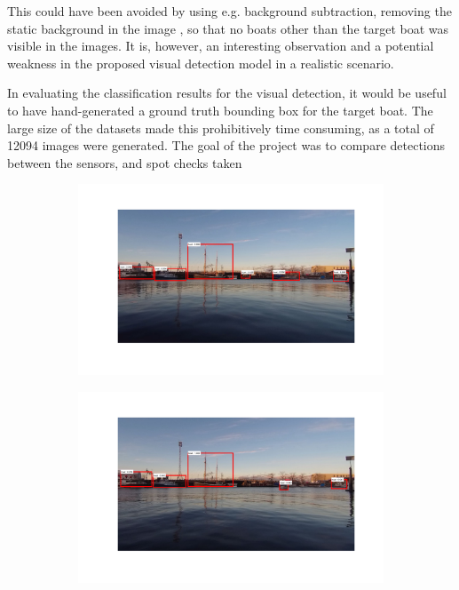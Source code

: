 This could have been avoided by using e.g. background subtraction, removing the static background in the image \cite{modernCV}, so that no boats other than the target boat was visible in the images. It is, however, an interesting observation and a potential weakness in the proposed visual detection model in a realistic scenario.

In evaluating the classification results for the visual detection, it would be useful to have hand-generated a ground truth bounding box for the target boat. The large size of the datasets made this prohibitively time consuming, as a total of 12094 images were generated. The goal of the project was to compare detections between the sensors, and spot checks taken 

\begin{figure}
	\centering
	\begin{subfigure}[t]{.5\textwidth}
	\centering
	\includegraphics[width=\linewidth]{fig/discussion/ex1_1.png}
	\end{subfigure}%
	\begin{subfigure}[t]{.5\textwidth}
	\centering
	\includegraphics[width=\linewidth]{fig/discussion/ex2_1.png}
	\end{subfigure}


\end{figure}
